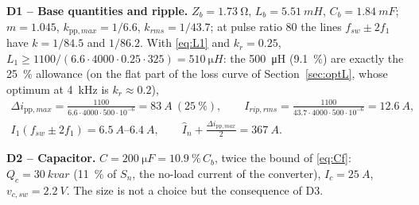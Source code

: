 \documentclass[10pt,a4paper]{scrartcl}
\newcommand{\fsw}{f_{sw}}
\newcommand{\pp}{\mathrm{pp}}
\begin{document}
\begin{onehalfspace}
\textbf{D1 -- Base quantities and ripple.} $Z_b = \SI{1.73}{\ohm}$, $L_b = \SI{5.51}{mH}$, $C_b = \SI{1.84}{mF}$; $m = 1.045$, $k_{\pp,max} = 1/6.6$, $k_{rms} = 1/43.7$; at pulse ratio 80 the lines $\fsw \pm 2f_1$ have $k = 1/84.5$ and $1/86.2$. With \eqref{eq:L1} and $k_r = 0.25$, $L_1 \ge 1100/(6.6 \cdot 4000 \cdot 0.25 \cdot 325) = \SI{510}{\micro H}$: the \SI{500}{\micro H} (\SI{9.1}{\percent}) are exactly the \SI{25}{\percent} allowance (on the flat part of the loss curve of Section~\ref{sec:optL}, whose optimum at \SI{4}{kHz} is $k_r \approx 0.2$),
\begin{gather*}
\Delta i_{\pp,max} = \frac{1100}{6.6 \cdot 4000 \cdot 500\cdot 10^{-6}} = \SI{83}{A}\ (\SI{25}{\percent}),\qquad
I_{rip,rms} = \frac{1100}{43.7 \cdot 4000 \cdot 500\cdot 10^{-6}} = \SI{12.6}{A},\\
I_1(\fsw \pm 2f_1) = \SIrange{6.5}{6.4}{A},\qquad \hat I_n + \frac{\Delta i_{\pp,max}}{2} = \SI{367}{A}.
\end{gather*}

\textbf{D2 -- Capacitor.} $C = \SI{200}{\micro F} = \SI{10.9}{\percent}\,C_b$, twice the bound of \eqref{eq:Cf}: $Q_c = \SI{30}{kvar}$ (\SI{11}{\percent} of $S_n$, the no-load current of the converter), $I_c = \SI{25}{A}$, $v_{c,sw} = \SI{2.2}{V}$. The size is not a choice but the consequence of D3.


\end{onehalfspace}
\end{document}
